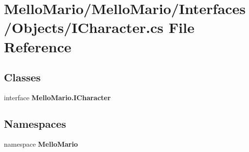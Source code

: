 \section{Mello\+Mario/\+Mello\+Mario/\+Interfaces/\+Objects/\+I\+Character.cs File Reference}
\label{ICharacter_8cs}
\subsection*{Classes}
\begin{DoxyCompactItemize}
\item 
interface \textbf{ Mello\+Mario.\+I\+Character}
\end{DoxyCompactItemize}
\subsection*{Namespaces}
\begin{DoxyCompactItemize}
\item 
namespace \textbf{ Mello\+Mario}
\end{DoxyCompactItemize}
